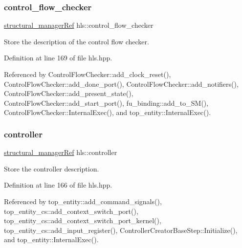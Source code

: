 \mbox{\label{classhls_aff2527283e4877a38dbf1f071127caff}} 
\subsubsection{\texorpdfstring{control\+\_\+flow\+\_\+checker}{control\_flow\_checker}}
{\footnotesize\ttfamily \hyperlink{structural__manager_8hpp_ab3136f0e785d8535f8d252a7b53db5b5}{structural\+\_\+manager\+Ref} hls\+::control\+\_\+flow\+\_\+checker}



Store the description of the control flow checker. 



Definition at line 169 of file hls.\+hpp.



Referenced by Control\+Flow\+Checker\+::add\+\_\+clock\+\_\+reset(), Control\+Flow\+Checker\+::add\+\_\+done\+\_\+port(), Control\+Flow\+Checker\+::add\+\_\+notifiers(), Control\+Flow\+Checker\+::add\+\_\+present\+\_\+state(), Control\+Flow\+Checker\+::add\+\_\+start\+\_\+port(), fu\+\_\+binding\+::add\+\_\+to\+\_\+\+S\+M(), Control\+Flow\+Checker\+::\+Internal\+Exec(), and top\+\_\+entity\+::\+Internal\+Exec().

\mbox{\label{classhls_a48cb5a4df024d43eabe08db9a90b1ffd}} 
\subsubsection{\texorpdfstring{controller}{controller}}
{\footnotesize\ttfamily \hyperlink{structural__manager_8hpp_ab3136f0e785d8535f8d252a7b53db5b5}{structural\+\_\+manager\+Ref} hls\+::controller}



Store the controller description. 



Definition at line 166 of file hls.\+hpp.



Referenced by top\+\_\+entity\+::add\+\_\+command\+\_\+signals(), top\+\_\+entity\+\_\+cs\+::add\+\_\+context\+\_\+switch\+\_\+port(), top\+\_\+entity\+\_\+cs\+::add\+\_\+context\+\_\+switch\+\_\+port\+\_\+kernel(), top\+\_\+entity\+\_\+cs\+::add\+\_\+input\+\_\+register(), Controller\+Creator\+Base\+Step\+::\+Initialize(), and top\+\_\+entity\+::\+Internal\+Exec().

